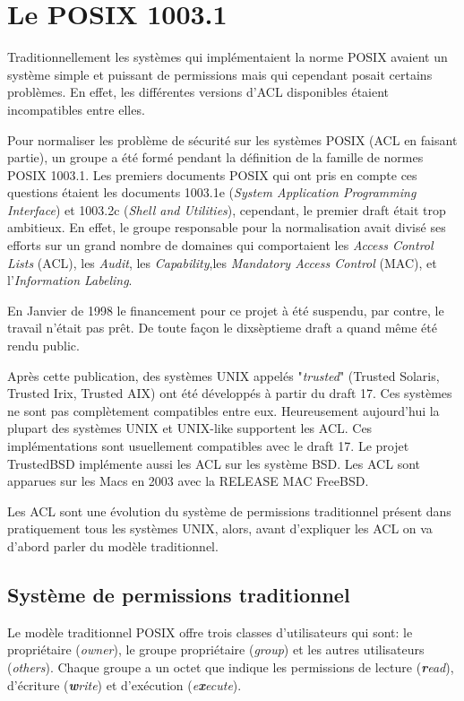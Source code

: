 \section{Le POSIX 1003.1}
 
Traditionnellement les systèmes qui implémentaient la norme POSIX avaient un système simple et puissant de permissions mais qui cependant posait certains problèmes. En effet, les différentes versions d'ACL disponibles étaient incompatibles entre elles.
 
Pour normaliser les problème de sécurité sur les systèmes POSIX (ACL en faisant partie), un groupe a été formé pendant la définition de la famille de normes POSIX 1003.1. Les premiers documents POSIX qui ont pris en compte ces questions étaient les documents 1003.1e (\emph{System Application Programming Interface}) et 1003.2c (\emph{Shell and Utilities}), cependant, le premier draft était trop ambitieux. En effet, le groupe responsable pour la normalisation avait divisé ses efforts sur un grand nombre de domaines qui comportaient les \emph{Access Control Lists} (ACL), les \emph{Audit}, les \emph{Capability},les \emph{ Mandatory Access Control }(MAC), et l'\emph{Information Labeling}\cite{aclsuse}.
 
En Janvier de 1998\cite{aclsuse} le financement pour ce projet à été suspendu, par contre, le travail n'était pas prêt. De toute façon le dixsèptieme draft a quand même été rendu public\cite{posix17}.
 
Après cette publication, des systèmes UNIX appelés "\emph{trusted}" (Trusted Solaris, Trusted Irix, Trusted AIX) ont été développés à partir du draft 17. Ces systèmes ne sont pas complètement compatibles entre eux. Heureusement aujourd'hui la plupart des systèmes UNIX et UNIX-like supportent les ACL. Ces implémentations sont usuellement compatibles avec le draft 17. Le projet TrustedBSD implémente aussi les ACL sur les système BSD. Les ACL sont apparues sur les Macs en 2003 avec la RELEASE MAC FreeBSD.
 
Les ACL sont une évolution du système de permissions traditionnel présent dans pratiquement tous les systèmes UNIX, alors, avant d'expliquer les ACL on va d'abord parler du modèle traditionnel.
 
\subsection*{Système de permissions traditionnel}
 
Le modèle traditionnel POSIX offre trois classes d'utilisateurs qui sont: le propriétaire (\emph{owner}), le groupe propriétaire (\emph{group}) et les autres utilisateurs (\emph{others}). Chaque groupe a un octet que indique les permissions de lecture (\emph{\textbf{r}ead}), d'écriture (\emph{\textbf{w}rite}) et d'exécution (\emph{e\textbf{x}ecute}).
 
